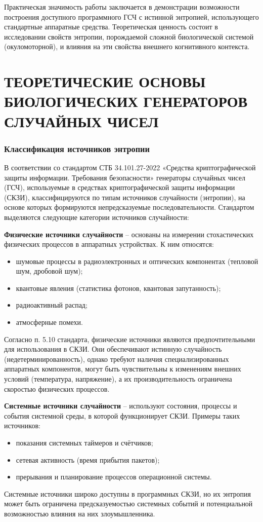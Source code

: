 \documentclass[14pt, a4paper]{extreport}
\newcommand{\resetchaptercounter}{
  \setcounter{chapter}{0}
}
\let\oldchapter\chapter
\renewcommand{\chapter}{%
  \setcounter{subsection}{0}%
  \oldchapter%
}
\begin{document}
Практическая значимость работы заключается в демонстрации возможности построения доступного программного ГСЧ с истинной энтропией, использующего стандартные аппаратные средства. Теоретическая ценность состоит в исследовании свойств энтропии, порождаемой сложной биологической системой (окуломоторной), и влияния на эти свойства внешнего когнитивного контекста.

\newpage
\resetchaptercounter  %
\chapter{ТЕОРЕТИЧЕСКИЕ ОСНОВЫ БИОЛОГИЧЕСКИХ ГЕНЕРАТОРОВ СЛУЧАЙНЫХ ЧИСЕЛ}

\subsection{Классификация источников энтропии}

В соответствии со стандартом СТБ 34.101.27-2022 «Средства криптографической защиты информации. Требования безопасности» генераторы случайных чисел (ГСЧ), используемые в средствах криптографической защиты информации (СКЗИ), классифицируются по типам источников случайности (энтропии), на основе которых формируются непредсказуемые последовательности. Стандартом выделяются следующие категории источников случайности:

\textbf{Физические источники случайности} – основаны на измерении стохастических физических процессов в аппаратных устройствах. К ним относятся:
\begin{itemize}
    \item шумовые процессы в радиоэлектронных и оптических компонентах (тепловой шум, дробовой шум);
    \item квантовые явления (статистика фотонов, квантовая запутанность);
    \item радиоактивный распад;
    \item атмосферные помехи.
\end{itemize}
Согласно п. 5.10 стандарта, физические источники являются предпочтительными для использования в СКЗИ. Они обеспечивают истинную случайность (недетерминированность), однако требуют наличия специализированных аппаратных компонентов, могут быть чувствительны к изменениям внешних условий (температура, напряжение), а их производительность ограничена скоростью физических процессов.

\textbf{Системные источники случайности} – используют состояния, процессы и события системной среды, в которой функционирует СКЗИ. Примеры таких источников:
\begin{itemize}
    \item показания системных таймеров и счётчиков;
    \item сетевая активность (время прибытия пакетов);
    \item прерывания и планирование процессов операционной системы.
\end{itemize}
Системные источники широко доступны в программных СКЗИ, но их энтропия может быть ограничена предсказуемостью системных событий и потенциальной возможностью влияния на них злоумышленника.
\end{document}
